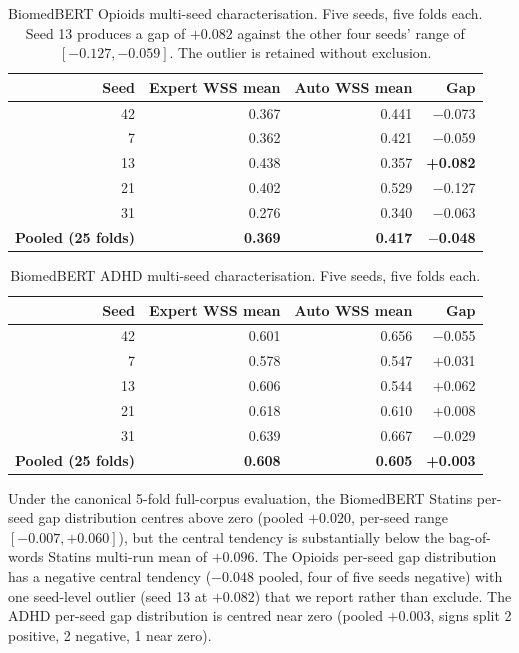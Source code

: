 \documentclass{article}
\begin{document}
\begin{table}[h]
\centering
\small
\begin{tabular}{rrrr}
\toprule
Seed & Expert WSS mean & Auto WSS mean & Gap \\
\midrule
42 & 0.367 & 0.441 & $-$0.073 \\
7  & 0.362 & 0.421 & $-$0.059 \\
13 & 0.438 & 0.357 & \textbf{+0.082} \\
21 & 0.402 & 0.529 & $-$0.127 \\
31 & 0.276 & 0.340 & $-$0.063 \\
\midrule
\textbf{Pooled (25 folds)} & \textbf{0.369} & \textbf{0.417} & \textbf{$-$0.048} \\
\bottomrule
\end{tabular}
\caption{BiomedBERT Opioids multi-seed characterisation. Five seeds, five folds each. Seed 13 produces a gap of $+0.082$ against the other four seeds' range of $[-0.127, -0.059]$. The outlier is retained without exclusion.}
\label{tab:bert_opiods}
\end{table}

\begin{table}[h]
\centering
\small
\begin{tabular}{rrrr}
\toprule
Seed & Expert WSS mean & Auto WSS mean & Gap \\
\midrule
42 & 0.601 & 0.656 & $-$0.055 \\
7  & 0.578 & 0.547 & +0.031 \\
13 & 0.606 & 0.544 & +0.062 \\
21 & 0.618 & 0.610 & +0.008 \\
31 & 0.639 & 0.667 & $-$0.029 \\
\midrule
\textbf{Pooled (25 folds)} & \textbf{0.608} & \textbf{0.605} & \textbf{+0.003} \\
\bottomrule
\end{tabular}
\caption{BiomedBERT ADHD multi-seed characterisation. Five seeds, five folds each.}
\label{tab:bert_adhd}
\end{table}

Under the canonical 5-fold full-corpus evaluation, the BiomedBERT Statins per-seed gap distribution centres above zero (pooled $+0.020$, per-seed range $[-0.007, +0.060]$), but the central tendency is substantially below the bag-of-words Statins multi-run mean of $+0.096$. The Opioids per-seed gap distribution has a negative central tendency ($-0.048$ pooled, four of five seeds negative) with one seed-level outlier (seed 13 at $+0.082$) that we report rather than exclude. The ADHD per-seed gap distribution is centred near zero (pooled $+0.003$, signs split 2 positive, 2 negative, 1 near zero).
\end{document}
